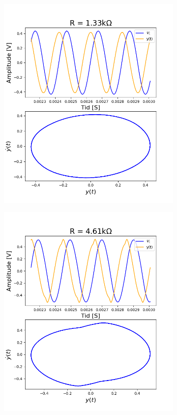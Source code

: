 \documentclass[a4paper,11pt,norsk]{article}
\begin{document}
\begin{figure}
\centering
    \begin{subfigure}{0.45\linewidth}
\includegraphics[width=\linewidth]{D1/Images/1.png} 
    \caption{}
\label{fig:1a}
    \end{subfigure}\hfill
    \begin{subfigure}{0.45\linewidth}
\includegraphics[width=\linewidth]{D1/Images/4.png}

\end{subfigure}
\end{figure}
\end{document}
